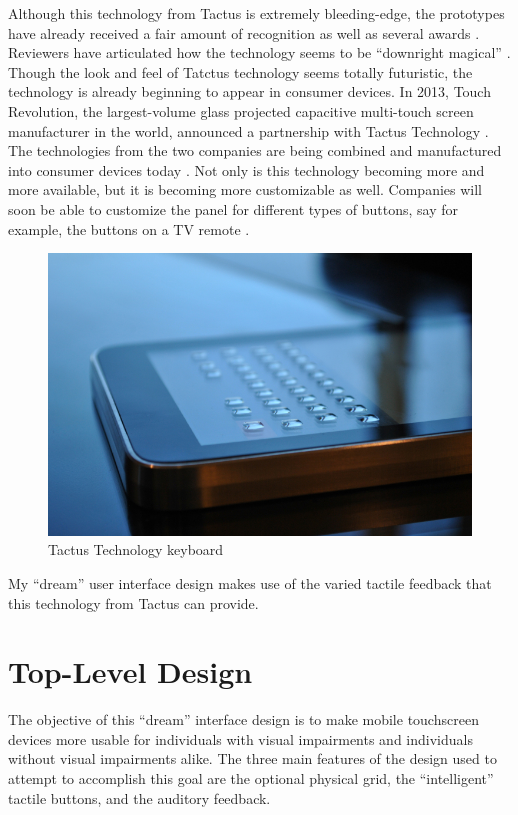 \documentclass[11pt]{article}
\begin{document}
Although this technology from Tactus is extremely bleeding-edge, the prototypes have already received a fair amount of recognition as well as several awards \cite{CNN, I-Zone, PCMag, Wired}. Reviewers have articulated how the technology seems to be ``downright magical'' \cite{CNN}. Though the look and feel of Tatctus technology seems totally futuristic, the technology is already beginning to appear in consumer devices. In 2013, Touch Revolution, the largest-volume glass projected capacitive multi-touch screen manufacturer in the world, announced a partnership with Tactus Technology \cite{TactusAvailability}. The technologies from the two companies are being combined and manufactured into consumer devices today \cite{TactusAvailability}. Not only is this technology becoming more and more available, but it is becoming more customizable as well. Companies will soon be able to customize the panel for different types of buttons, say for example, the buttons on a TV remote \cite{CNN}.

\begin{figure}[ht]
\centering
\includegraphics[width=4.5in]{tactus2.jpg} 
\caption{Tactus Technology keyboard}
\label{tactus1}
\end{figure}

My ``dream'' user interface design makes use of the varied tactile feedback that this technology from Tactus can provide.


\section{Top-Level Design}
The objective of this ``dream'' interface design is to make mobile touchscreen devices more usable for individuals with visual impairments and individuals without visual impairments alike. The three main features of the design used to attempt to accomplish this goal are the optional physical grid, the ``intelligent'' tactile buttons, and the auditory feedback. 
\end{document}
